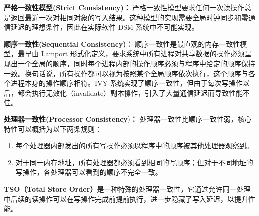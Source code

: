 {\textbf{严格一致性模型(Strict Consistency)：} 严格一致性模型要求任何一次读操作总是返回最近一次对相同对象的写入结果。这种模型的实现需要全局时钟同步和零通信延迟的理想条件，因此在实际软件 DSM 系统中不可能实现。

\textbf{顺序一致性(Sequential Consistency)：} 顺序一致性是最直观的内存一致性模型，最早由 Lamport 形式化定义，要求系统中所有进程对共享数据的操作必须呈现出一个全局的顺序，同时每个进程内部的操作顺序必须与程序中给定的顺序保持一致。换句话说，所有操作都可以视为按照某个全局顺序依次执行，这个顺序与各个进程本身的操作顺序相符。IVY 系统实现了顺序一致性，但由于每次写操作以后，都会执行无效化（invalidate）副本操作，引入了大量通信延迟而导致性能不佳。

\textbf{处理器一致性(Processor Consistency)：} 处理器一致性比顺序一致性弱，核心特性可以概括为以下两条规则：
\begin{enumerate}[label=\arabic*.]
    \item 每个处理器内部发出的所有写操作必须以程序中的顺序被其他处理器观察到。
    \item 对于同一内存地址，所有处理器都必须看到相同的写顺序；但对于不同地址的写操作，各处理器可以看到的顺序不完全一致。
\end{enumerate}
\textbf{TSO（Total Store Order）}是一种特殊的处理器一致性，它通过允许同一处理中后续的读操作可以在写操作完成前提前执行，进一步隐藏了写入延迟，以提升性能。

}

